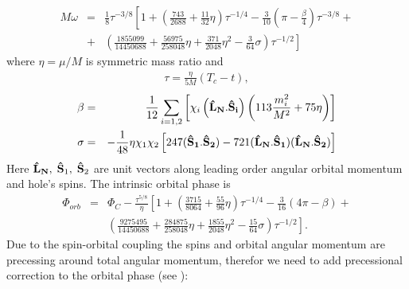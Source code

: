 \documentclass{iopart}
\def\bSo{{\bf \hat{S}_1}}
\def\bSt{{\bf \hat{S}_2}}
\def\bL{{\bf \hat{L}_{N}}}
\begin{document}
\begin{eqnarray}
M\omega &=& \frac1{8}\tau^{-3/8} \left[1 + \left(\frac{743}{2688} + \frac{11}{32}\eta\right)\tau^{-1/4} - 
            \frac3{10}\left(\pi - \frac{\beta}{4}\right)\tau^{-3/8} + 
            \right. \nonumber \\ 
            &+& \left.
            \left(\frac{1855099}{14450688} + 
           \frac{56975}{258048}\eta + \frac{371}{2048}\eta^2 - \frac{3}{64}\sigma\right)\tau^{-1/2}\right]
 \end{eqnarray}
where $\eta = \mu/M$ is symmetric mass ratio and 
\begin{eqnarray}
\tau = \frac{\eta}{5M}(T_c - t),
\end{eqnarray}
\begin{eqnarray}
\beta &=& \frac1{12}\sum_{i=1,2} \left[ 
\chi_i \left(\bL.{\bf \hat{S}_i}\right)\left(113\frac{m_i^2}{M^2} + 75\eta\right)
\right] \\
\sigma &=& -\frac1{48}\eta\chi_1\chi_2\left[ 247(\bSo.\bSt) - 721(\bL.\bSo)(\bL.\bSt)
\right]
\end{eqnarray}
Here $\bL, \; {\bf \hat{S}}_1,\;{\bf \hat{S}}_2$ 
are unit vectors along leading order angular orbital momentum and hole's spins.
The intrinsic orbital phase is 
\begin{eqnarray}
\Phi_{orb} &=& \Phi_C - \frac{\tau^{5/8}}{\eta}\left[ 1 + 
  \left(  \frac{3715}{8064} + \frac{55}{96}\eta \right)\tau^{-1/4}
  - \frac{3}{16}(4\pi - \beta) + \right. \nonumber \\
  & & \left. \left( \frac{9275495}{14450688}+ \frac{284875}{258048}\eta+ \frac{1855}{2048}\eta^2 - \frac{15}{64}\sigma  \right) \tau^{-1/2}
\right]. \label{OrbPhN}
\end{eqnarray}
Due to the spin-orbital coupling the spins and orbital angular momentum are precessing around
total angular momentum, therefor we need to add precessional correction to the orbital 
phase (see \cite{ACST}):
\end{document}
